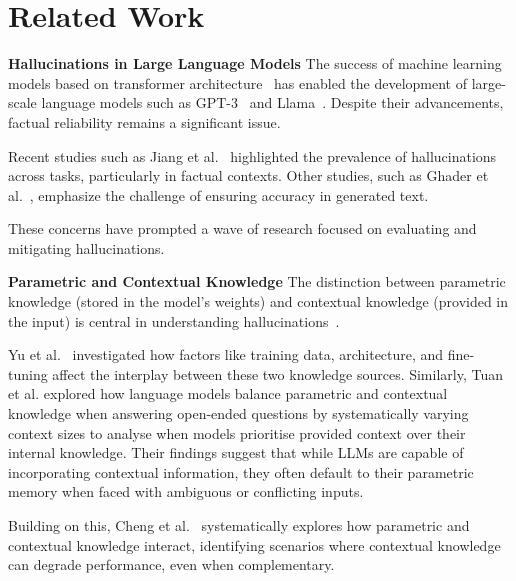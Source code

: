 \section{Related Work}
\label{related_work}



\textbf{Hallucinations in Large Language Models}
The success of machine learning models based on transformer architecture~\cite{attention_is_all_you_need} has enabled the development of large-scale language models such as GPT-3~\cite{gpt3} and Llama~\cite{llama}.
Despite their advancements, factual reliability remains a significant issue.

Recent studies such as Jiang et al.~\cite{how_can_we_know} highlighted the prevalence of hallucinations across tasks, particularly in factual contexts.
Other studies, such as Ghader et al.~\cite{can_rag_models_reason}, emphasize the challenge of ensuring accuracy in generated text.

These concerns have prompted a wave of research focused on evaluating and mitigating hallucinations.

\textbf{Parametric and Contextual Knowledge} 
The distinction between parametric knowledge (stored in the model's weights) and contextual knowledge (provided in the input) is central in understanding hallucinations~\cite{knowledge}.

Yu et al.~\cite{factual_recall} investigated how factors like training data, architecture, and fine-tuning affect the interplay between these two knowledge sources.
Similarly, Tuan et al.\cite{when_context_leads} explored how language models balance parametric and contextual knowledge when answering open-ended questions by systematically varying context sizes to analyse when models prioritise provided context over their internal knowledge.
Their findings suggest that while LLMs are capable of incorporating contextual information, they often default to their parametric memory when faced with ambiguous or conflicting inputs.

Building on this, Cheng et al.~\cite{understanding_the_interplay} systematically explores how parametric and contextual knowledge interact, identifying scenarios where contextual knowledge can degrade performance, even when complementary.

